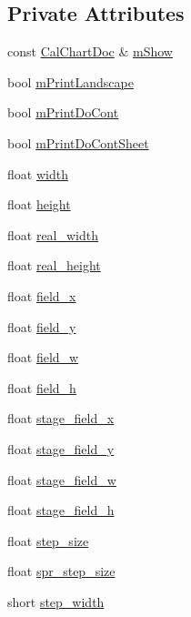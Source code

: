 \subsection*{Private Attributes}
\begin{DoxyCompactItemize}
\item 
const \hyperlink{a00020}{Cal\-Chart\-Doc} \& \hyperlink{a00118_af9df46c2a771d020126fd4e4549d4286}{m\-Show}
\item 
bool \hyperlink{a00118_a6857b38639294662683a99f7af7e9ae0}{m\-Print\-Landscape}
\item 
bool \hyperlink{a00118_a1ff74249b2c563b38d4404dbd4522de9}{m\-Print\-Do\-Cont}
\item 
bool \hyperlink{a00118_a73ba59ac44c27e4f0400701cb39fcb04}{m\-Print\-Do\-Cont\-Sheet}
\item 
float \hyperlink{a00118_a1b34fecf2552966f482b6cce79d6ff62}{width}
\item 
float \hyperlink{a00118_a3d08d292e9930ddd9c85dc1c093cc1b8}{height}
\item 
float \hyperlink{a00118_a40e9619a338ed6e3a7034d6581b3c7fa}{real\-\_\-width}
\item 
float \hyperlink{a00118_a2c786f01bfe3040cbd4cdea34b3c9324}{real\-\_\-height}
\item 
float \hyperlink{a00118_aa2cc2eac57bca71d708716324a4bc5be}{field\-\_\-x}
\item 
float \hyperlink{a00118_ad357c80509c5e0f73ad4b2b55d34e3ad}{field\-\_\-y}
\item 
float \hyperlink{a00118_a25911c61a33ab186f330044aa8e46325}{field\-\_\-w}
\item 
float \hyperlink{a00118_aab6a2bb01e25a1c9fce059d5deec7245}{field\-\_\-h}
\item 
float \hyperlink{a00118_af5c7efd71ddd485cb731fa6e2581ee33}{stage\-\_\-field\-\_\-x}
\item 
float \hyperlink{a00118_a4545be7df0e04d2337ea26cbb8277784}{stage\-\_\-field\-\_\-y}
\item 
float \hyperlink{a00118_a6438435eebae9051220c41fc8b9355eb}{stage\-\_\-field\-\_\-w}
\item 
float \hyperlink{a00118_a99b5ba360e7968e419aca9f296e017e4}{stage\-\_\-field\-\_\-h}
\item 
float \hyperlink{a00118_adcc58ec30b8188b8cb10a8516f7d3f46}{step\-\_\-size}
\item 
float \hyperlink{a00118_a7c5c6f7128cd9f6e859a813d5fdbe609}{spr\-\_\-step\-\_\-size}
\item 
short \hyperlink{a00118_ab4edd8fa1bf5977aa65974fe72c8afcd}{step\-\_\-width}

\end{DoxyCompactItemize}
